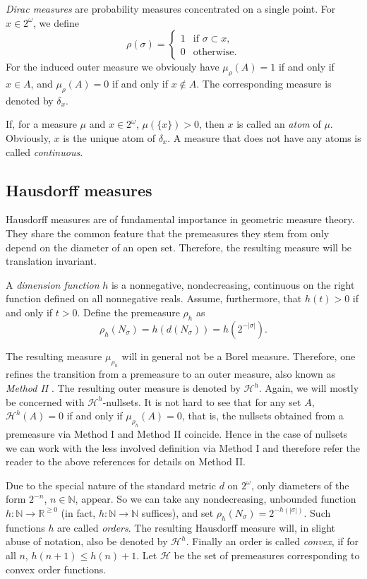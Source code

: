\documentclass[11pt,reqno]{article}
\theoremstyle{plain}
\theoremstyle{definition}
\theoremstyle{remark}
\numberwithin{equation}{section}
\newcommand{\Nat}{\ensuremath{\mathbb{N}}}
\newcommand{\Real}{\ensuremath{\mathbb{R}}}
\newcommand{\Cant}{\ensuremath{2^{\omega}}}
\newcommand{\Cyl}[1]{\ensuremath{N_{#1}}}
\newcommand{\Hmeas}{\ensuremath{\mathcal{H}}}
\newcommand{\Hm}[1]{\ensuremath{\Hmeas^{#1}}}
\begin{document}
\medskip
\emph{Dirac measures} are probability measures concentrated on a single point. For $x \in \Cant$, we define
\[
	\rho(\sigma) = \begin{cases}
	   	1 & \text{if } \sigma \subset x, \\
		0 & \text{otherwise.}
	\end{cases}
\]
For the induced outer measure we obviously have $\mu_\rho(A) = 1$ if and only if $x \in A$, and $\mu_\rho(A) = 0$ if and only if $x \not\in A$. The corresponding measure is denoted by $\delta_x$.

\medskip
If, for a measure $\mu$ and $x \in \Cant$, $\mu(\{x\}) > 0$, then $x$
is called an \emph{atom} of $\mu$. Obviously, $x$ is the unique atom of
$\delta_x$. A measure that does not have any atoms is called
\emph{continuous}.

%
%
\subsection{Hausdorff measures}

Hausdorff measures are of fundamental importance in geometric measure theory. They share the common feature that the premeasures they stem from only depend on the diameter of an open set. Therefore, the resulting measure will be translation invariant. 

A \emph{dimension function} $h$ is a nonnegative, nondecreasing, continuous on the right function defined on all nonnegative reals. Assume, furthermore, that $h(t) > 0$ if and only if $t>0$. Define the premeasure $\rho_h$ as
\[
	\rho_h(\Cyl{\sigma}) = h(d(\Cyl{\sigma})) = h(2^{-|\sigma|}).
\]

The resulting measure $\mu_{\rho_h}$ will in general not be a Borel measure. Therefore, one refines the transition from a premeasure to an outer measure, also known as \emph{Method II} \citep{munroe:1953, rogers:1970}. The resulting outer measure is denoted by $\Hm{h}$. Again, we will mostly be concerned with $\mathcal{H}^h$-nullsets. It is not hard to see that for any set $A$, $\mathcal{H}^h(A)= 0$ if and only if $\mu_{\rho_h}(A)=0$, that is, the nullsets obtained from a premeasure via Method I and Method II coincide. Hence in the case of nullsets we can work with the less involved definition via Method I and therefore refer the reader to the above references for details on Method II.

Due to the special nature of the standard metric $d$ on $\Cant$, only diameters of the form $2^{-n}$, $n \in \Nat$, appear. So we can take any nondecreasing, unbounded function $h: \Nat \to \Real^{\geq 0}$ (in fact, $h: \Nat \to \Nat$ suffices), and set $\rho_h(\Cyl{\sigma}) = 2^{-h(|\sigma|)}$. Such functions $h$ are called \emph{orders}. The resulting Hausdorff measure will, in slight abuse of notation, also be denoted by $\mathcal{H}^{h}$. Finally an order is called \emph{convex}, if for all $n$, $h(n+1) \leq h(n) + 1$. Let $\Hmeas$ be the set of premeasures corresponding to convex order functions.
\end{document}
